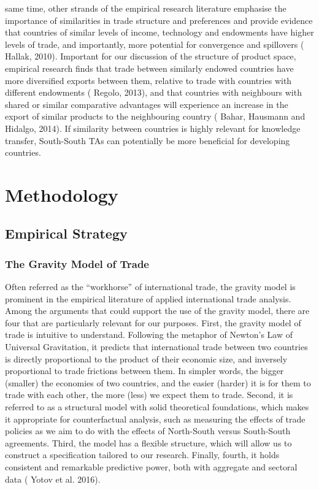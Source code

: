\documentclass[12pt]{article}%
\begin{document}
same time, other strands of the empirical research literature emphasise
the importance of similarities in trade structure and preferences and
provide evidence that countries of similar levels of income, technology
and endowments have higher levels of trade, and importantly, more
potential for convergence and spillovers (\cite{hallak_product-quality_2010} Hallak, 2010). Important for
our discussion of the structure of product space, empirical research
finds that trade between similarly endowed countries have more
diversified exports between them, relative to trade with countries with
different endowments (\cite{regolo_export_2013} Regolo, 2013), and that countries with neighbours
with shared or similar comparative advantages will experience an
increase in the export of similar products to the neighbouring country
(\cite{bahar_neighbors_2014} Bahar, Hausmann and Hidalgo, 2014). If similarity between countries is
highly relevant for knowledge transfer, South-South TAs can potentially
be more beneficial for developing countries.

%
\section{Methodology}%
\label{sec:Methodology}%
\subsection{Empirical Strategy}%
\label{subsec:EmpiricalStrategy}%
\subsubsection{The Gravity Model of Trade}%
\label{ssubsec:TheGravityModelofTrade}%

%
Often referred as the ``workhorse'' of international trade, the gravity
model is prominent in the empirical literature of applied international
trade analysis. Among the arguments that could support the use of the
gravity model, there are four that are particularly relevant for our
purposes. First, the gravity model of trade is intuitive to understand.
Following the metaphor of Newton's Law of Universal Gravitation, it
predicts that international trade between two countries is directly
proportional to the product of their economic size, and inversely
proportional to trade frictions between them. In simpler words, the
bigger (smaller) the economies of two countries, and the easier (harder)
it is for them to trade with each other, the more (less) we expect them
to trade. Second, it is referred to as a structural model with solid
theoretical foundations, which makes it appropriate for counterfactual
analysis, such as measuring the effects of trade policies as we aim to
do with the effects of North-South versus South-South agreements. Third,
the model has a flexible structure, which will allow us to construct a
specification tailored to our research. Finally, fourth, it holds
consistent and remarkable predictive power, both with aggregate and
sectoral data (\cite{yotov_advanced_2016} Yotov et al. 2016).
\end{document}
